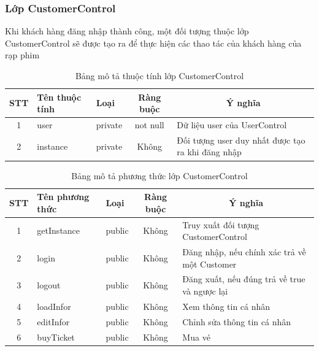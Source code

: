 \documentclass[a4paper, 12pt]{article}
\begin{document}
\subsubsection{Lớp CustomerControl}
Khi khách hàng đăng nhập thành công, một đối tượng thuộc lớp CustomerControl sẽ được tạo ra để thực hiện các thao tác của khách hàng của rạp phim
\begin{table}[H]
	\begin{center}
		\begin{tabular}{|c|l|l|c|l|}
		\hline
		STT & Tên thuộc tính & Loại    & Ràng buộc & \multicolumn{1}{c|}{Ý nghĩa}                                           \\ \hline
		1   & user           & private &    not null       & Dữ liệu user của UserControl                      \\ \hline
		2   & instance       & private &         Không  & Đối tượng user duy nhất được tạo ra khi đăng nhập \\ \hline
		\end{tabular}
		\caption{Bảng mô tả thuộc tính lớp CustomerControl}
	\end{center}
\end{table}

\begin{table}[H]
	\begin{center}
		\begin{tabular}{|c|l|l|c|l|}
		\hline
		STT & Tên phương thức & Loại   & Ràng buộc & \multicolumn{1}{c|}{Ý nghĩa}                                      \\ \hline
		1   & getInstance     & public &   Không        & Truy xuất đối tượng CustomerControl          \\ \hline
		2   & login           & public &   Không        & Đăng nhập, nếu chính xác trả về một Customer \\ \hline
		3   & logout          & public &   Không        & Đăng xuất, nếu đúng trả về true và ngược lại \\ \hline
		4   & loadInfor       & public &   Không        & Xem thông tin cá nhân                        \\ \hline
		5   & editInfor       & public &   Không        & Chỉnh sửa thông tin cá nhân                  \\ \hline
		6   & buyTicket       & public &   Không        & Mua vé                                       \\ \hline
		\end{tabular}
		\caption{Bảng mô tả phương thức lớp CustomerControl}
	\end{center}
\end{table}
\end{document}
